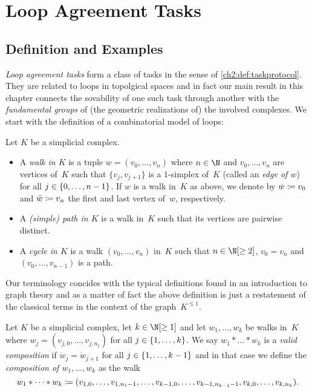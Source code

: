 \chapter{Loop Agreement Tasks}
\label{ch3}
\section{Definition and Examples}
\emph{Loop agreement tasks} form a class of tasks in the sense of
\cref{ch2:def:taskprotocol}. They are related to loops in topolgical spaces
and in fact our main result in this chapter 
connects the sovability of one such task through another with the
\emph{fundamental groups} of (the geometric realizations of) the
involved complexes. We start with the definition of a combinatorial
model of loops:

\begin{thDef}
    Let $K$ be a simplicial complex.
    \begin{itemize}
        \item
            A \emph{walk in $K$} is a tuple $w = (v_0,\dots,v_n)$
            where $n\in\N$ and $v_0,\dots,v_n$ are vertices
            of~$K$ such that $\{v_j,v_{j+1}\}$ is a $1$-simplex of~$K$
            (called an \emph{edge of $w$}) for all $j\in\{0,\ldots,n-1\}$.
            If $w$ is a walk in~$K$ as above, we denote by $\dot w \coloneqq v_0$
            and $\ddot w \coloneqq v_n$ the first and last vertex of~$w$,
            respectively.
            
        \item
            A \emph{(simple) path in $K$} is a walk in~$K$ such that its
            vertices are pairwise distinct.
            
        \item
            A \emph{cycle in $K$} is a walk $(v_0,\dots,v_n)$ in~$K$ such that
            $n\in\N[\geq2]$, $v_0 = v_n$ and $(v_0,\dots,v_{n-1})$ is a path.
    \end{itemize}
\end{thDef}

Our terminology concides with the typical definitions found in an introduction
to graph theory and as a matter of fact the above definition is just a
restatement of the classical terms in the context of the graph~$K^{\leq 1}$.

\begin{thDef}
    Let $K$ be a simplicial complex, let $k\in\N[\geq1]$ and let $w_1,\dots,w_k$
    be walks in~$K$ where $w_j = (v_{j,0}, \dots, v_{j,n_j})$ for all
    $j\in\{1,\ldots,k\}$.  We say $w_1\ast\dots\ast w_k$ is a \emph{valid
    composition} if $\ddot{w}_j = \dot{w}_{j+1}$ for all $j\in\{1,\ldots,k-1\}$
    and in that case we define the \emph{composition of $w_1,\dots,w_k$} as the
    walk
    \[ w_1\ast\dots\ast w_k
        \coloneqq (v_{1,0},\dots,v_{1,n_1-1},
                \dots,
                v_{k-1,0},\dots,v_{k-1,n_{k-1}-1},
                v_{k,0},\dots,v_{k,n_k})
    . \]
\end{thDef}

